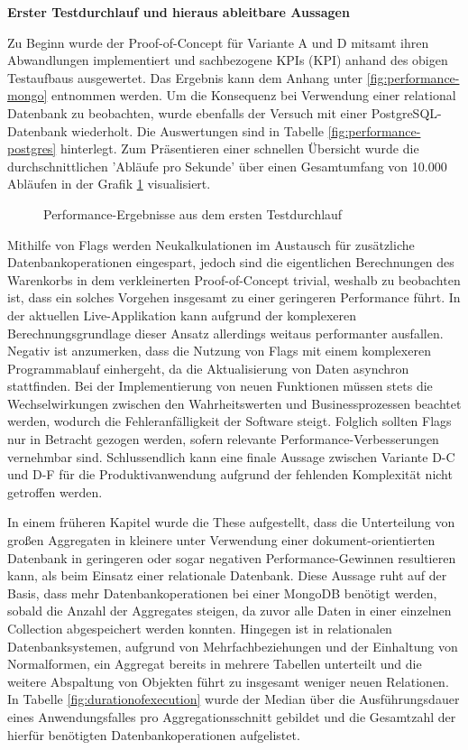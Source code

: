 \textbf{Erster Testdurchlauf und hieraus ableitbare Aussagen}

Zu Beginn wurde der Proof-of-Concept für Variante A und D mitsamt ihren Abwandlungen implementiert und sachbezogene \acrshort{KPI}s (\acrlong{KPI}) anhand des obigen Testaufbaus ausgewertet. Das Ergebnis kann dem Anhang unter \ref{fig:performance-mongo} entnommen werden. Um die Konsequenz bei Verwendung einer relational Datenbank zu beobachten, wurde ebenfalls der Versuch mit einer PostgreSQL-Datenbank wiederholt. Die Auswertungen sind in Tabelle \ref{fig:performance-postgres} hinterlegt. Zum Präsentieren einer schnellen Übersicht wurde die durchschnittlichen 'Abläufe pro Sekunde' über einen Gesamtumfang von 10.000 Abläufen in der Grafik \ref{fig:PerformanceDefault} visualisiert.

\begin{figure}
	\centering
	\footnotesize
	
	\caption{Performance-Ergebnisse aus dem ersten Testdurchlauf}
	\label{fig:PerformanceDefault}
\end{figure}

Mithilfe von Flags werden Neukalkulationen im Austausch für zusätzliche Datenbankoperationen eingespart, jedoch sind die eigentlichen Berechnungen des Warenkorbs in dem verkleinerten Proof-of-Concept trivial, weshalb zu beobachten ist, dass ein solches Vorgehen insgesamt zu einer geringeren Performance führt. In der aktuellen Live-Applikation kann aufgrund der komplexeren Berechnungsgrundlage dieser Ansatz allerdings weitaus performanter ausfallen. Negativ ist anzumerken, dass die Nutzung von Flags mit einem komplexeren Programmablauf einhergeht, da die Aktualisierung von Daten asynchron stattfinden. Bei der Implementierung von neuen Funktionen müssen stets die Wechselwirkungen zwischen den Wahrheitswerten und Businessprozessen beachtet werden, wodurch die Fehleranfälligkeit der Software steigt. Folglich sollten Flags nur in Betracht gezogen werden, sofern relevante Performance-Verbesserungen vernehmbar sind. Schlussendlich kann eine finale Aussage zwischen Variante D-C und D-F für die Produktivanwendung aufgrund der fehlenden Komplexität nicht getroffen werden.

In einem früheren Kapitel wurde die These aufgestellt, dass die Unterteilung von großen Aggregaten in kleinere unter Verwendung einer dokument-orientierten Datenbank in geringeren oder sogar negativen Performance-Gewinnen resultieren kann, als beim Einsatz einer relationale Datenbank. Diese Aussage ruht auf der Basis, dass mehr Datenbankoperationen bei einer MongoDB benötigt werden, sobald die Anzahl der Aggregates steigen, da zuvor alle Daten in einer einzelnen Collection abgespeichert werden konnten. Hingegen ist in relationalen Datenbanksystemen, aufgrund von Mehrfachbeziehungen und der Einhaltung von Normalformen, ein Aggregat bereits in mehrere Tabellen unterteilt und die weitere Abspaltung von Objekten führt zu insgesamt weniger neuen Relationen. In Tabelle \ref{fig:durationofexecution} wurde der Median über die Ausführungsdauer eines Anwendungsfalles pro Aggregationsschnitt gebildet und die Gesamtzahl der hierfür benötigten Datenbankoperationen aufgelistet. 

